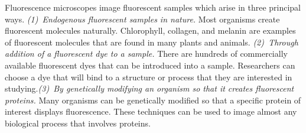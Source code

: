 \documentclass[11pt]{article}
\begin{document}
Fluorescence microscopes image fluorescent samples which arise in three
principal ways. \textit{(1)~Endogenous fluorescent samples in nature.} Most
organisms create fluorescent molecules naturally. Chlorophyll, collagen, and
melanin are examples of fluorescent molecules that are found in many plants and
animals. \textit{(2)~Through addition of a fluorescent dye to a sample.}  There
are hundreds of commercially available fluorescent dyes that can be introduced
into a sample. Researchers can choose a dye that will bind to a structure or
process that they are interested in
studying.\hspace{0.4em}\textit{(3)~By genetically modifying an organism so that it
  creates fluorescent proteins.} Many organisms can be genetically modified so
that a specific protein of interest displays fluorescence. These techniques can
be used to image almost any biological process that involves proteins.
\end{document}
